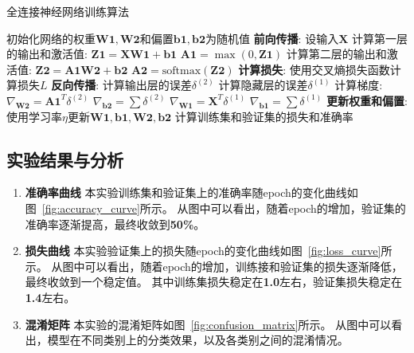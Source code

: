 \documentclass[12pt]{article}
\begin{document}
\begin{algorithm}
  \caption{全连接神经网络训练算法}
  \label{FullyConnectedNN Training Algorithm}
  \begin{algorithmic}[1]
    \State 初始化网络的权重$\mathbf{W1}, \mathbf{W2}$和偏置$\mathbf{b1}, \mathbf{b2}$为随机值
    \State \textbf{前向传播}:
    \State \quad 设输入$\mathbf{X}$
    \State \quad 计算第一层的输出和激活值:
    \State \quad \quad $\mathbf{Z1} = \mathbf{X} \mathbf{W1} + \mathbf{b1}$
    \State \quad \quad $\mathbf{A1} = \max(0, \mathbf{Z1})$ 
    \State \quad 计算第二层的输出和激活值:
    \State \quad \quad $\mathbf{Z2} = \mathbf{A1} \mathbf{W2} + \mathbf{b2}$
    \State \quad \quad $\mathbf{A2} = \text{softmax}(\mathbf{Z2})$
    \State \textbf{计算损失}:
    \State \quad 使用交叉熵损失函数计算损失$L$
    \State \textbf{反向传播}:
    \State \quad 计算输出层的误差$\delta^{(2)}$
    \State \quad 计算隐藏层的误差$\delta^{(1)}$
    \State \quad 计算梯度:
    \State \quad \quad $\nabla_{\mathbf{W2}} = \mathbf{A1}^T \delta^{(2)}$
    \State \quad \quad $\nabla_{\mathbf{b2}} = \sum \delta^{(2)}$
    \State \quad \quad $\nabla_{\mathbf{W1}} = \mathbf{X}^T \delta^{(1)}$
    \State \quad \quad $\nabla_{\mathbf{b1}} = \sum \delta^{(1)}$
    \State \textbf{更新权重和偏置}:
    \State \quad 使用学习率$\eta$更新$\mathbf{W1}, \mathbf{b1}, \mathbf{W2}, \mathbf{b2}$
    \EndFor
    \State 计算训练集和验证集的损失和准确率
    \EndFor
    \EndProcedure
  \end{algorithmic}
\end{algorithm}

\subsection{实验结果与分析}

\begin{enumerate}
  \item \textbf{准确率曲线}
        本实验训练集和验证集上的准确率随epoch的变化曲线如图~\ref{fig:accuracy_curve}所示。
        从图中可以看出，随着epoch的增加，验证集的准确率逐渐提高，最终收敛到\textbf{50\%}。
  \item \textbf{损失曲线}
        本实验验证集上的损失随epoch的变化曲线如图~\ref{fig:loss_curve}所示。
        从图中可以看出，随着epoch的增加，训练接和验证集的损失逐渐降低，最终收敛到一个稳定值。
        其中训练集损失稳定在\textbf{1.0}左右，验证集损失稳定在\textbf{1.4}左右。
  \item \textbf{混淆矩阵}
        本实验的混淆矩阵如图~\ref{fig:confusion_matrix}所示。
        从图中可以看出，模型在不同类别上的分类效果，以及各类别之间的混淆情况。
\end{enumerate}
\end{document}
